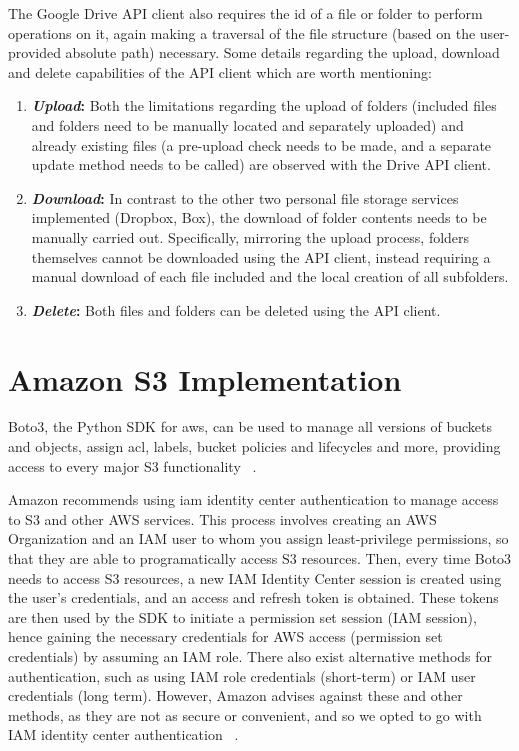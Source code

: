 The Google Drive API client also requires the id of a file or folder to perform operations on it, again making a traversal of the file structure (based on the user-provided absolute path) necessary. Some details regarding the upload, download and delete capabilities of the API client which are worth mentioning: ~\cite{drive_docs}

\begin{enumerate}
    \item \textbf{\textit{Upload}:} Both the limitations regarding the upload of folders  (included files and folders need to be manually located and separately uploaded) and already existing files (a pre-upload check needs to be made, and a separate update method needs to be called) are observed with the Drive API client.

    \item \textbf{\textit{Download}:} In contrast to the other two personal file storage services implemented (Dropbox, Box), the download of folder contents needs to be manually carried out. Specifically, mirroring the upload process, folders themselves cannot be downloaded using the API client, instead requiring a manual download of each file included and the local creation of all subfolders.

    \item \textbf{\textit{Delete}:} Both files and folders can be deleted using the API client.
\end{enumerate}


\section{Amazon S3 Implementation}
Boto3, the Python SDK for \ac{aws},  can be used to manage all versions of buckets and objects, assign \ac{acl}, labels, bucket policies and lifecycles and more, providing access to every major S3 functionality ~\cite{s3_docs}. 

Amazon recommends using \ac{iam} identity center authentication to manage access to S3 and other AWS services. This process involves creating an AWS Organization and an IAM user to whom you assign least-privilege permissions, so that they are able to programatically access S3 resources. Then, every time Boto3 needs to access S3 resources, a new IAM Identity Center session is created using the user's credentials, and an access and refresh token is obtained. These tokens are then used by the SDK to initiate a permission set session (IAM session), hence gaining the necessary credentials for AWS access (permission set credentials) by assuming an IAM role. There also exist alternative methods for authentication, such as using IAM role credentials (short-term) or IAM user credentials (long term). However, Amazon advises against these and other methods, as they are not as secure or convenient, and so we opted to go with IAM identity center authentication ~\cite{s3_auth}.

